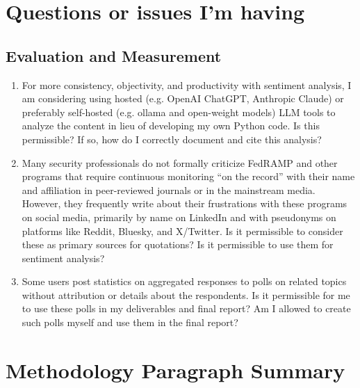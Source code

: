 \documentclass{jdf}
\begin{document}
\section*{Questions or issues I'm having}

\subsection*{Evaluation and Measurement}

\begin{enumerate}
    \item For more consistency, objectivity, and productivity with sentiment analysis, I am considering using hosted (e.g. OpenAI ChatGPT, Anthropic Claude) or preferably self-hosted (e.g. ollama and open-weight models) LLM tools to analyze the content in lieu of developing my own Python code. Is this permissible? If so, how do I correctly document and cite this analysis?
    \item Many security professionals do not formally criticize FedRAMP and other programs that require continuous monitoring ``on the record'' with their name and affiliation in peer-reviewed journals or in the mainstream media. However, they frequently write about their frustrations with these programs on social media, primarily by name on LinkedIn and with pseudonyms on platforms like Reddit, Bluesky, and X/Twitter. Is it permissible to consider these as primary sources for quotations? Is it permissible to use them for sentiment analysis?
    \item Some users post statistics on aggregated responses to polls on related topics without attribution or details about the respondents. Is it permissible for me to use these polls in my deliverables and final report? Am I allowed to create such polls myself and use them in the final report?
\end{enumerate}

\section*{Methodology Paragraph Summary}
\end{document}
